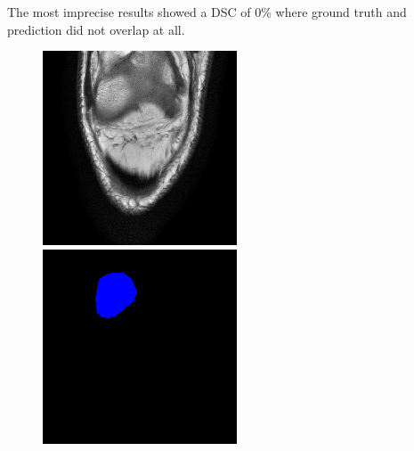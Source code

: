 The most imprecise results showed a DSC of 0\% where ground truth and prediction did not overlap at all.

\begin{figure}[H]
  \includegraphics[width=\linewidth]{imgs/a8.png}
\endminipage\hfill
{}
  \includegraphics[width=\linewidth]{imgs/b8.png}

\end{figure}
